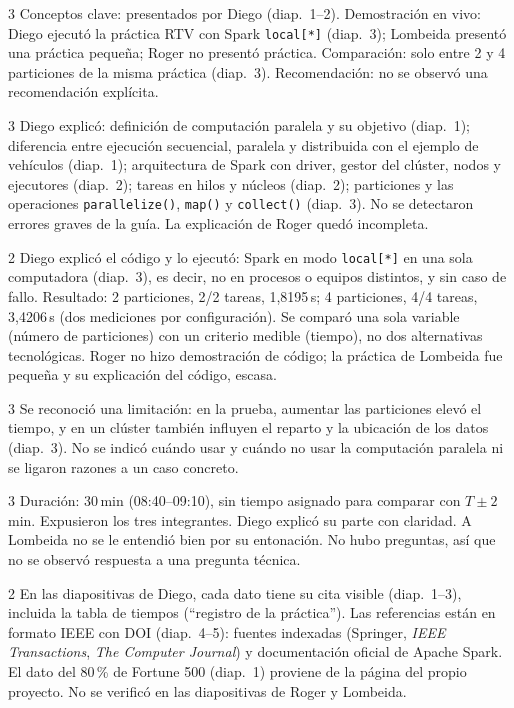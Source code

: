 \begin{dimensiones}
	{3}
	{Conceptos clave: presentados por Diego (diap.~1--2). Demostración en vivo:
		Diego ejecutó la práctica RTV con Spark \texttt{local[*]} (diap.~3);
		Lombeida presentó una práctica pequeña; Roger no presentó práctica.
		Comparación: solo entre 2 y 4 particiones de la misma práctica (diap.~3).
		Recomendación: no se observó una recomendación explícita.}
	
	{3}
	{Diego explicó: definición de computación paralela y su objetivo
		(diap.~1); diferencia entre ejecución secuencial, paralela y distribuida con
		el ejemplo de vehículos (diap.~1); arquitectura de Spark con driver, gestor
		del clúster, nodos y ejecutores (diap.~2); tareas en hilos y núcleos
		(diap.~2); particiones y las operaciones \texttt{parallelize()},
		\texttt{map()} y \texttt{collect()} (diap.~3). No se detectaron errores
		graves de la guía. La explicación de Roger quedó incompleta.}
	
	{2}
	{Diego explicó el código y lo ejecutó: Spark en modo \texttt{local[*]}
		en una sola computadora (diap.~3), es decir, no en procesos o equipos
		distintos, y sin caso de fallo. Resultado: 2 particiones, 2/2 tareas,
		1,8195\,s; 4 particiones, 4/4 tareas, 3,4206\,s (dos mediciones por
		configuración). Se comparó una sola variable (número de particiones) con
		un criterio medible (tiempo), no dos alternativas tecnológicas. Roger no
		hizo demostración de código; la práctica de Lombeida fue pequeña y su
		explicación del código, escasa.}
	
	{3}
	{Se reconoció una limitación: en la prueba, aumentar las particiones
		elevó el tiempo, y en un clúster también influyen el reparto y la
		ubicación de los datos (diap.~3). No se indicó cuándo usar y cuándo no
		usar la computación paralela ni se ligaron razones a un caso concreto.}
	
	{3}
	{Duración: 30\,min (08:40--09:10), sin tiempo asignado para comparar con
		$T \pm 2$\,min. Expusieron los tres integrantes. Diego explicó su parte con
		claridad. A Lombeida no se le entendió bien por su entonación. No hubo
		preguntas, así que no se observó respuesta a una pregunta técnica.}
	
	{2}
	{En las diapositivas de Diego, cada dato tiene su cita visible (diap.~1--3),
		incluida la tabla de tiempos (``registro de la práctica''). Las referencias
		están en formato IEEE con DOI (diap.~4--5): fuentes indexadas (Springer,
		\emph{IEEE Transactions}, \emph{The Computer Journal}) y documentación
     oficial de Apache Spark. El dato del 80\,\% de Fortune 500 (diap.~1)
     proviene de la página del propio proyecto. No se verificó en las diapositivas de Roger y Lombeida.}
\end{dimensiones}

